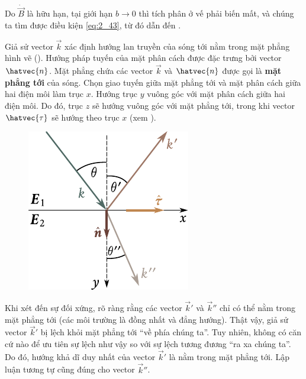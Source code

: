 \noindent
Do $\dot{\vec{B}}$ là hữu hạn, tại giới hạn $b\to 0$ thì tích phân ở vế phải biến mất, và chúng ta tìm được điều kiện \eqref{eq:2_43}, từ đó dẫn đến .

Giả sử vector $\vec{k}$ xác định hướng lan truyền của sóng tới nằm trong mặt phẳng hình vẽ ().
Hướng pháp tuyến của mặt phân cách được đặc trưng bởi vector $\hatvec{n}$.
Mặt phẳng chứa các vector $\vec{k}$ và $\hatvec{n}$ được gọi là \textbf{mặt phẳng tới} của sóng.
Chọn giao tuyến giữa mặt phẳng tới và mặt phân cách giữa hai điện môi làm trục $x$.
Hướng trục $y$ vuông góc với mặt phân cách giữa hai điện môi.
Do đó, trục $z$ sẽ hướng vuông góc với mặt phẳng tới, trong khi vector $\hatvec{\tau}$ sẽ hướng theo trục $x$ (xem ).

\begin{figure}[!htb]
	\begin{center}
		\includegraphics[scale=1]{figures/ch_16/fig_16_2.pdf}
		\caption[]{}
		\label{fig:16_2}
	\end{center}
	\vspace{-0.8cm}
\end{figure}

Khi xét đến sự đối xứng, rõ ràng rằng các vector $\vec{k}'$ và $\vec{k}''$ chỉ có thể nằm trong mặt phẳng tới (các môi trường là đồng nhất và đẳng hướng).
Thật vậy, giả sử vector $\vec{k}'$ bị lệch khỏi mặt phẳng tới ``về phía chúng ta''.
Tuy nhiên, không có căn cứ nào để ưu tiên sự lệch như vậy so với sự lệch tương đương ``ra xa chúng ta''.
Do đó, hướng khả dĩ duy nhất của vector $\vec{k}'$ là nằm trong mặt phẳng tới. Lập luận tương tự cũng đúng cho vector $\vec{k}''$.

